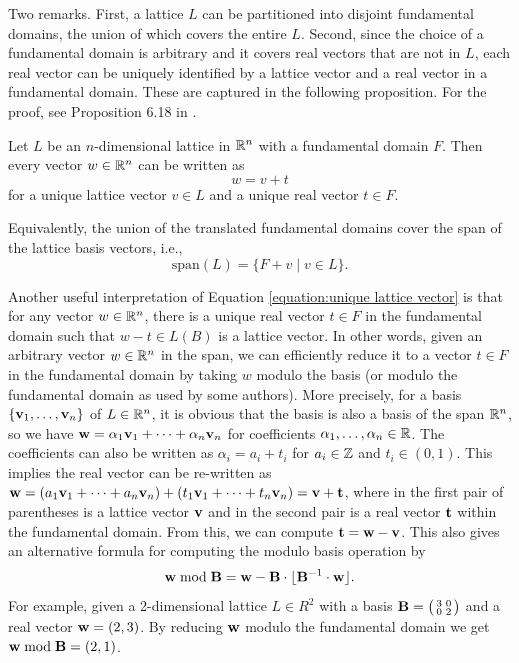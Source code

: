\documentclass[../main.tex]{subfiles}
\begin{document}
Two remarks. First, a lattice $L$ can be partitioned into disjoint fundamental domains, the union of which covers the entire $L$. Second, since the choice of a fundamental domain is arbitrary and it covers real vectors that are not in $L$, each real vector can be uniquely identified by a lattice vector and a real vector in a fundamental domain. These are captured in the following proposition. For the proof, see Proposition 6.18 in \cite{hoffstein2008introduction}.  

\begin{proposition}
Let $L$ be an $n$-dimensional lattice in $\mathbb{R}^n$ with a fundamental domain $F$. Then every vector $w \in \mathbb{R}^n$ can be written as 
\begin{equation}
\label{equation:unique lattice vector}
    w = v + t
\end{equation}
for a unique lattice vector $v \in L$ and a unique real vector $t \in F$. 

Equivalently, the union of the translated fundamental domains cover the span of the lattice basis vectors, i.e., 
\begin{equation*}
    \text{span}(L) = \{F + v \mid v \in L\}.
\end{equation*}
\end{proposition}


Another useful interpretation of Equation \ref{equation:unique lattice vector} is that for any vector $w \in \mathbb{R}^n$, there is a unique real vector $t \in F$ in the fundamental domain such that $w-t \in L(B)$ is a lattice vector. In other words, given an arbitrary vector $w \in \mathbb{R}^n$ in the span, we can efficiently reduce it to a vector $t \in F$ in the fundamental domain 
\reversemarginpar
{}
by taking $w$ modulo the basis (or modulo the fundamental domain as used by some authors). More precisely, for a basis $\{\mathbf{v}_1, \dots, \mathbf{v}_n\}$ of $L \in \mathbb{R}^n$, it is obvious that the basis is also a basis of the span $\mathbb{R}^n$, so we have $\mathbf{w}=\alpha_1 \mathbf{v}_1 + \cdots + \alpha_n \mathbf{v}_n$ for coefficients $\alpha_1, \dots, \alpha_n \in \mathbb{R}$. The coefficients can also be written as $\alpha_i = a_i + t_i$ for $a_i \in \mathbb{Z}$ and $t_i \in (0,1)$. This implies the real vector can be re-written as $\mathbf{w}=(a_1 \mathbf{v}_1 + \cdots + a_n \mathbf{v}_n) + (t_1 \mathbf{v}_1 + \cdots + t_n \mathbf{v}_n)=\mathbf{v}+\mathbf{t}$, where in the first pair of parentheses is a lattice vector $\mathbf{v}$ and in the second pair is a real vector $\mathbf{t}$ within the fundamental domain. From this, we can compute $\mathbf{t}=\mathbf{w}-\mathbf{v}$. This also gives an alternative formula for computing the modulo basis operation by
\begin{equation}\label{eq:modulo lattice}
    \mathbf{w} \bmod \mathbf{B} = \mathbf{w} - \mathbf{B} \cdot \lfloor \mathbf{B}^{-1} \cdot \mathbf{w} \rfloor.
\end{equation}
For example, given a 2-dimensional lattice $L \in R^2$ with a basis 
$\mathbf{B}=\big(\begin{smallmatrix}
  3 & 0\\
  0 & 2
\end{smallmatrix}\big)$ and a real vector $\mathbf{w}=(2,3)$. By reducing $\mathbf{w}$ modulo the fundamental domain we get $\mathbf{w} \bmod \mathbf{B} = (2,1)$.
\end{document}

